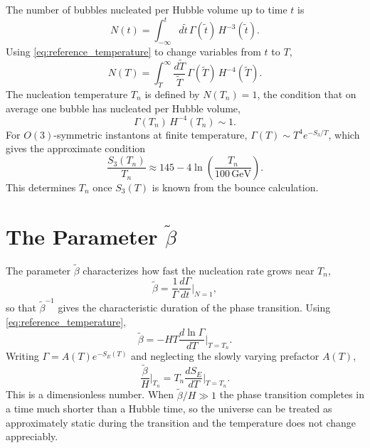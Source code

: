 The number of bubbles nucleated per Hubble volume up to time $t$ is
\begin{equation}
	N(t) = \int_{-\infty}^{t}d\tilde t\,
	\Gamma(\tilde t)\,H^{-3}(\tilde t).
\end{equation}
Using \eqref{eq:reference_temperature} to change variables from $t$
to $T$,
\begin{equation}
	N(T) = \int_T^{\infty}\frac{d\tilde T}{\tilde T}\,
	\Gamma(\tilde T)\,H^{-4}(\tilde T).
\end{equation}
The nucleation temperature $T_n$ is defined by $N(T_n) = 1$, the
condition that on average one bubble has nucleated per Hubble volume,
\begin{equation}
	\Gamma(T_n)\,H^{-4}(T_n) \sim 1.
\end{equation}
For $O(3)$-symmetric instantons at finite temperature,
$\Gamma(T) \sim T^4 e^{-S_3/T}$, which gives the approximate condition
\begin{equation}
	\frac{S_3(T_n)}{T_n} \approx 145
	- 4\ln\!\left(\frac{T_n}{100\,\text{GeV}}\right).
\end{equation}
This determines $T_n$ once $S_3(T)$ is known from the bounce
calculation.

\section{The Parameter \texorpdfstring{$\tilde\beta$}{beta}}

The parameter $\tilde\beta$ characterizes how fast the nucleation rate
grows near $T_n$,
\begin{equation}
	\tilde\beta = \frac{1}{\Gamma}\frac{d\Gamma}{dt}
	\bigg|_{N=1},
\end{equation}
so that $\tilde\beta^{-1}$ gives the characteristic duration of the
phase transition. Using \eqref{eq:reference_temperature},
\begin{equation}
	\tilde\beta = -HT\frac{d\ln\Gamma}{dT}\bigg|_{T=T_n}.
\end{equation}
Writing $\Gamma = A(T)e^{-S_E(T)}$ and neglecting the slowly varying
prefactor $A(T)$,
\begin{equation}
	\boxed{\frac{\tilde\beta}{H}\bigg|_{T_n}
		= T_n\frac{dS_E}{dT}\bigg|_{T=T_n}.}
\end{equation}
This is a dimensionless number. When $\tilde\beta/H \gg 1$ the phase
transition completes in a time much shorter than a Hubble time, so
the universe can be treated as approximately static during the
transition and the temperature does not change appreciably.

